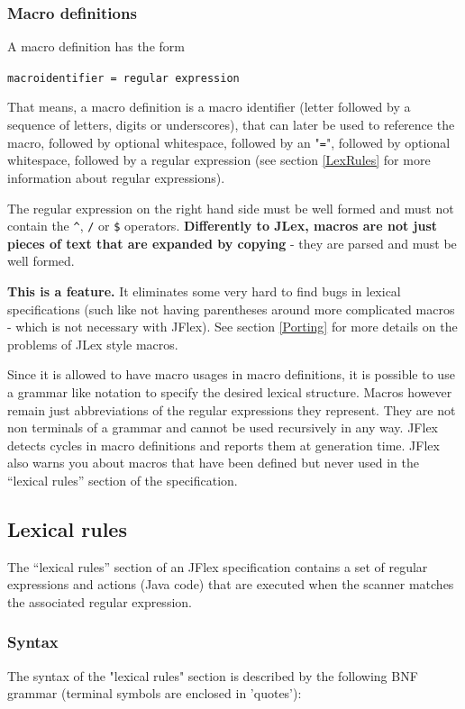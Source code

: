 \documentclass[11pt]{scrartcl}
\begin{document}
\subsubsection{Macro definitions\label{MacroDefs}}
A macro definition has the form

\texttt{macroidentifier = regular expression}

That means, a macro definition is a macro identifier (letter followed
by a sequence of letters, digits or underscores), that can later be
used to reference the macro, followed by optional whitespace, followed
by an "\texttt{=}", followed by optional whitespace, followed by a
regular expression (see section \ref{LexRules}  for more information about regular expressions).

The regular expression on the right hand side must be well formed and
must not contain the \verb+^+, \texttt{/} or \texttt{\$} operators. {\bf Differently
to JLex, macros are not just pieces of text that are expanded by copying}
- they are parsed and must be well formed.

{\bf This is a feature.} It eliminates some very hard to find bugs in
lexical specifications (such like not having parentheses around more
complicated macros - which is not necessary with JFlex).  See section
\ref{Porting}  for more
details on the problems of JLex style macros.

Since it is allowed to have macro usages in macro definitions, it is
possible to use a grammar like notation to specify the desired lexical
structure. Macros however remain just abbreviations of the regular expressions
they represent. They are not non terminals of a grammar and cannot be used
recursively in any way. JFlex detects cycles in macro definitions and reports
them at generation time. JFlex also warns you about macros that have been
defined but never used in the ``lexical rules'' section of the specification.
  
\subsection{Lexical rules\label{LexRules}}
The ``lexical rules'' section of an JFlex specification contains a set of
regular expressions and actions (Java code) that are executed when the
scanner matches the associated regular expression.
 
\subsubsection{Syntax\label{Grammar}}
The syntax of the "lexical rules" section is described by the following
BNF grammar (terminal symbols are enclosed in 'quotes'):
\end{document}
